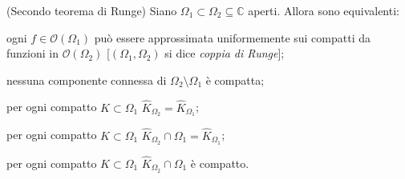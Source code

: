\begin{thm}
  (Secondo teorema di Runge) Siano $\Omega_1 \subset \Omega_2 \subseteq \mathbb{C}$ aperti. Allora sono equivalenti:
  \begin{nlist}
    \item ogni $f \in \mathcal{O}(\Omega_1)$ può essere approssimata uniformemente sui compatti da funzioni in $\mathcal{O}(\Omega_2)$ [$(\Omega_1, \Omega_2)$ si dice \textit{coppia di Runge}];
    \item nessuna componente connessa di $\Omega_2\setminus\Omega_1$ è compatta;
    \item per ogni compatto $K \subset \Omega_1$ $\widehat{K}_{\Omega_2}=\widehat{K}_{\Omega_1}$;
    \item per ogni compatto $K \subset \Omega_1$ $\widehat{K}_{\Omega_2}\cap \Omega_1=\widehat{K}_{\Omega_1}$;
    \item per ogni compatto $K \subset \Omega_1$ $\widehat{K}_{\Omega_2}\cap \Omega_1$ è compatto.
  \end{nlist}
\end{thm}

